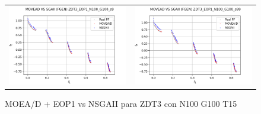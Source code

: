 \begin{figure}[H]
\begin{tabular}{c c}
    \includegraphics[scale=0.5]{figures/ZDT3_EOP1_N100_G100_T15/s9_comp.png} &
    \includegraphics[scale=0.5]{figures/ZDT3_EOP1_N100_G100_T15/s99_comp.png}\\
    \end{tabular}
    \caption{\centering MOEA/D + EOP1 vs NSGAII para ZDT3 con N100 G100 T15}
    \label{fig:3}
\end{figure}

